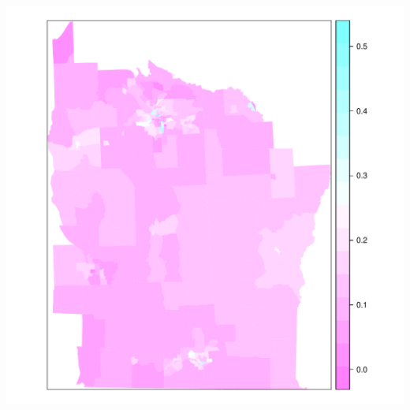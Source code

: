\documentclass{article}\usepackage[]{graphicx}\usepackage[]{color}
\makeatletter
\def\maxwidth{ %
  \ifdim\Gin@nat@width>\linewidth
    \linewidth
  \else
    \Gin@nat@width
  \fi
}
\newenvironment{knitrout}{}{} %
\makeatother
\begin{document}
\begin{knitrout}
\includegraphics[width=\maxwidth]{figure/unnamed-chunk-112} 

\end{knitrout}
\end{document}
